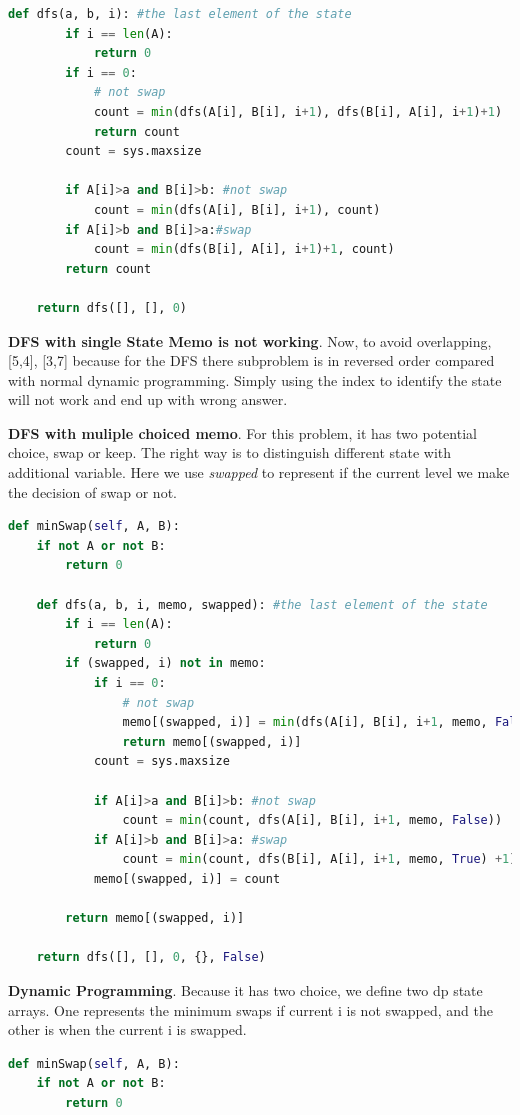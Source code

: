 \documentclass[../main.tex]{subfiles}
\begin{document}
\begin{enumerate}
\begin{lstlisting}[language = Python]
    def dfs(a, b, i): #the last element of the state
        if i == len(A):
            return 0
        if i == 0:
            # not swap
            count = min(dfs(A[i], B[i], i+1), dfs(B[i], A[i], i+1)+1)
            return count
        count = sys.maxsize
            
        if A[i]>a and B[i]>b: #not swap
            count = min(dfs(A[i], B[i], i+1), count)
        if A[i]>b and B[i]>a:#swap
            count = min(dfs(B[i], A[i], i+1)+1, count)
        return count

    return dfs([], [], 0)
\end{lstlisting}
\textbf{DFS with single State Memo is not working}. Now, to avoid overlapping, [5,4], [3,7] because for the DFS there subproblem is in reversed order compared with normal dynamic programming. Simply using the index to identify the state will not work and end up with wrong answer. 

\textbf{DFS with muliple choiced memo}. For this problem, it has two potential choice, swap or keep. The right way is to distinguish different state with additional variable. Here we use \textit{swapped} to represent if the  current level we make the decision of swap or not.
\begin{lstlisting}[language=Python]
def minSwap(self, A, B):
    if not A or not B:
        return 0
    
    def dfs(a, b, i, memo, swapped): #the last element of the state
        if i == len(A):
            return 0
        if (swapped, i) not in memo:
            if i == 0:
                # not swap
                memo[(swapped, i)] = min(dfs(A[i], B[i], i+1, memo, False), dfs(B[i], A[i], i+1, memo, True)+1)
                return memo[(swapped, i)] 
            count = sys.maxsize

            if A[i]>a and B[i]>b: #not swap
                count = min(count, dfs(A[i], B[i], i+1, memo, False))
            if A[i]>b and B[i]>a: #swap
                count = min(count, dfs(B[i], A[i], i+1, memo, True) +1)
            memo[(swapped, i)] = count
        
        return memo[(swapped, i)]

    return dfs([], [], 0, {}, False)
\end{lstlisting}
\textbf{Dynamic Programming}. Because it has two choice, we define two dp state arrays. One represents the minimum swaps if current i is not swapped, and the other is when the current i is swapped. 
\begin{lstlisting}[language=Python]
def minSwap(self, A, B):
    if not A or not B:
        return 0
    

\end{lstlisting}
\end{enumerate}
\end{document}
